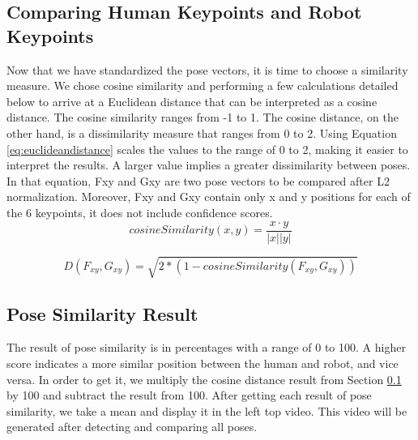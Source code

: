 \subsection{Comparing Human Keypoints and Robot Keypoints}
\label{subsec:comparing-keypoints}

Now that we have standardized the pose vectors, it is time to choose a similarity measure. We chose cosine similarity and performing a few calculations detailed below to arrive at a Euclidean distance that can be interpreted as a cosine distance.
The cosine similarity ranges from -1 to 1. The cosine distance, on the other hand, is a dissimilarity measure that ranges from 0 to 2.
Using Equation \ref{eq:euclideandistance} scales the values to the range of 0 to 2, making it easier to interpret the results. A larger value implies a greater dissimilarity between poses. In that equation, Fxy and Gxy are two pose vectors to be compared after L2 normalization. Moreover, Fxy and Gxy contain only x and y positions for each of the 6 keypoints, it does not include confidence scores.
\begin{equation} 
  \label{eq:cosinesimilarity}
  cosineSimilarity(x,y) = \frac{x \cdot y}{|x||y|}
\end{equation}

\begin{equation}
  \label{eq:euclideandistance}
  D(F_{xy}, G_{xy}) = \sqrt{2 * (1 - cosineSimilarity(F_{xy}, G_{xy}))}
\end{equation}


\subsection{Pose Similarity Result}
\label{subsec:pose-similarity-result}

The result of pose similarity is in percentages with a range of 0 to 100. A higher score indicates a more similar position between the human and robot, and vice versa.
In order to get it, we multiply the cosine distance result from Section \ref{subsec:comparing-keypoints} by 100 and subtract the result from 100.
After getting each result of pose similarity, we take a mean and display it in the left top video. This video will be generated after detecting and comparing all poses.